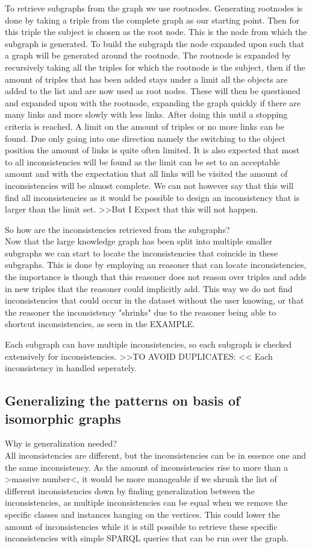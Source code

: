\documentclass{article}
\begin{document}
To retrieve subgraphs from the graph we use rootnodes. Generating rootnodes is done by taking a triple from the complete graph as our starting point. Then for this triple the subject is chosen as the root node. This is the node from which the subgraph is generated. To build the subgraph the node expanded upon such that a graph will be generated around the rootnode. 
The rootnode is expanded by recursively taking all the triples for which the rootnode is the subject, then if the amount of triples that has been added stays under a limit all the objects are added to the list and are now used as root nodes. These will then be questioned and expanded upon with the rootnode, expanding the graph quickly if there are many links and more slowly with less links. After doing this until a stopping criteria is reached. A limit on the amount of triples or no more links can be found. Due only going into one direction namely the switching to the object position the amount of links is quite often limited. 
It is also expected that most to all inconsistencies will be found as the limit can be set to an acceptable amount and with the expectation that all links will be visited the amount of inconsistencies will be almost complete. We can not however say that this will find all inconsistencies as it would be possible to design an inconsistency that is larger than the limit set. >>But I Expect that this will not happen.

So how are the inconsistencies retrieved from the subgraphs?\\
Now that the large knowledge graph has been split into multiple smaller subgraphs we can start to locate the inconsistencies that coincide in these subgraphs. This is done by employing an reasoner that can locate inconsistencies, the importance is though that this reasoner does not reason over triples and adds in new triples that the reasoner could implicitly add. This way we do not find inconsistencies that could occur in the dataset without the user knowing, or that the reasoner the inconsistency "shrinks" due to the reasoner being able to shortcut inconsistencies, as seen in the EXAMPLE.

Each subgraph can have multiple inconsistencies, so each subgraph is checked extensively for inconsistencies.  >>TO AVOID DUPLICATES: << Each inconsistency in handled seperately.


\subsection{Generalizing the patterns on basis of isomorphic graphs}
Why is generalization needed?\\
All inconsistencies are different, but the inconsistencies can be in essence one and the same inconsistency. As the amount of inconsistencies rise to more than a >massive number<, it would be more manageable if we shrunk the list of different inconsistencies down by finding generalization between the inconsistencies, as multiple inconsistencies can be equal when we remove the specific classes and instances hanging on the vertices. This could lower the amount of inconsistencies while it is still possible to retrieve these specific inconsistencies with simple SPARQL queries that can be run over the graph. 
\end{document}
